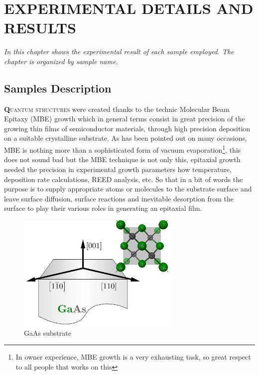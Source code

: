 
\chapter{EXPERIMENTAL DETAILS AND  RESULTS }
\label{chap:experimentals-details-and-results}
\textit{In this chapter shows the experimental result of each sample employed. The chapter is organized by sample name.}
\vfill
\minitoc
\newpage

\section{Samples Description}
\vspace{-10mm}
\lettrine[lines=3, lraise=.1, nindent=0mm, slope=0mm]{\textbf{Q}}{uantum structures} were created thanks to the technic Molecular Beam Epitaxy (MBE) growth which in general terms consist in great precision of the growing thin films of semiconductor materials, through high precision  deposition on a suitable  crystalline substrate. As has been pointed out on many occasions, MBE  is nothing more than a sophisticated form of vacuum evaporation\footnote{In owner  experience, MBE growth is a very exhausting task, so great respect to all people that works on this}\cite{orton2015molecular}, this does not sound bad but the MBE technique is not only this, epitaxial growth needed  the precision in experimental  growth parameters how temperature, deposition rate calculations, REED analysis, etc. So that in a bit of words the purpose is to  supply appropriate atoms or molecules to the substrate surface and leave surface diffusion, surface reactions and inevitable desorption from the surface to play their various roles in generating an epitaxial film\cite{orton2015molecular,grundmann2010physics}. 

\begin{figure}[H]
	\centering
	\includegraphics[width=0.7\textwidth]{../figures/chapter-3/crystal-1/build/crystal-1.pdf}
	\caption[GaAs substrate growth direction]{GaAs substrate}
	\label{fig:chapter-3 GaAs Substrate}
\end{figure}

